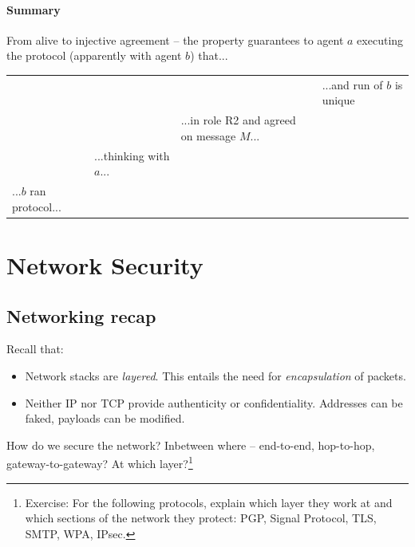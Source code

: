 \newpage

\horizontaldivider

\paragraph{Summary} From alive to injective agreement -- the property guarantees to agent $a$ executing the protocol (apparently with agent $b$) that...

\begin{table}[h]
\centering
\addtolength{\leftskip}{-0.9cm}

\begin{tabular}{|llll|}
\hline
 &  &  &  ...and run of $b$ is unique \\
 &  & ...in role R2 and agreed on message $M$... &  \\
 & ...thinking with $a$... &  &  \\
...$b$ ran protocol... &  &  & \\
\hline
\end{tabular}
\end{table}



\newpage
\section{Network Security}

\subsection{Networking recap}

Recall that:
\begin{itemize}
    \item Network stacks are \emph{layered}. This entails the need for \emph{encapsulation} of packets.
    \item Neither IP nor TCP provide authenticity or confidentiality. Addresses can be faked, payloads can be modified.
\end{itemize}

How do we secure the network? Inbetween where -- end-to-end, hop-to-hop, gateway-to-gateway? At which layer?\footnote{Exercise: For the following protocols, explain which layer they work at and which sections of the network they protect: PGP, Signal Protocol, TLS, SMTP, WPA, IPsec.}

